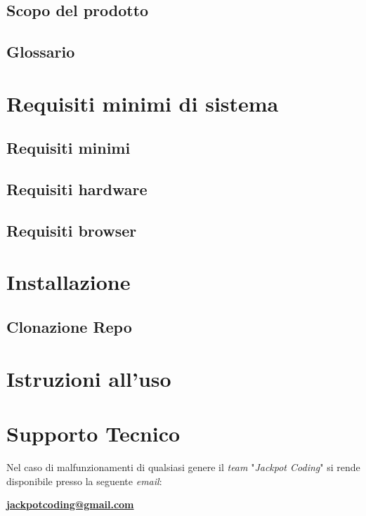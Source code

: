 \documentclass[5pt]{article}
\begin{document}
	\subsection{Scopo del prodotto}
        \subsection{Glossario}

	\section{Requisiti minimi di sistema}
        \subsection{Requisiti minimi}
        \subsection{Requisiti hardware}
        \subsection{Requisiti browser}
	
	\section{Installazione}
        \subsection{Clonazione Repo}
 
        \section{Istruzioni all'uso}
        
        \section{Supporto Tecnico}
        Nel caso di malfunzionamenti di qualsiasi genere il \textit{team} "\textit{Jackpot Coding}" si rende disponibile presso la seguente \textit{email}:
        \begin{center}
        \textbf{\url{jackpotcoding@gmail.com}}
        \end{center}
\end{document}
